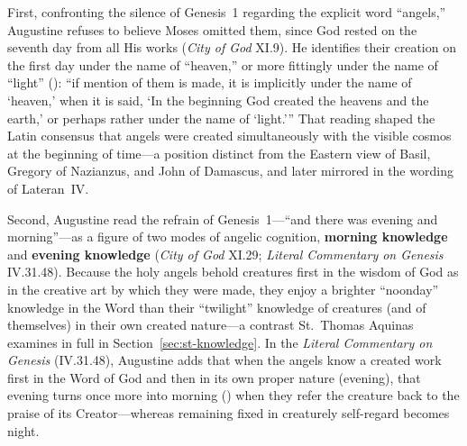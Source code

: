 First, confronting the silence of Genesis~1 regarding the explicit word ``angels,'' Augustine refuses to believe Moses omitted them, since God rested on the seventh day from all His works (\emph{City of God} XI.9). He identifies their creation on the first day under the name of ``heaven,'' or more fittingly under the name of ``light'' (): ``if mention of them is made, it is implicitly under the name of `heaven,' when it is said, `In the beginning God created the heavens and the earth,' or perhaps rather under the name of `light.''' That reading shaped the Latin consensus that angels were created simultaneously with the visible cosmos at the beginning of time---a position distinct from the Eastern view of Basil, Gregory of Nazianzus, and John of Damascus, and later mirrored in the wording of Lateran~IV.

Second, Augustine read the refrain of Genesis~1---``and there was evening and morning''---as a figure of two modes of angelic cognition, \textbf{morning knowledge} and \textbf{evening knowledge} (\emph{City of God} XI.29; \emph{Literal Commentary on Genesis} IV.31.48). Because the holy angels behold creatures first in the wisdom of God as in the creative art by which they were made, they enjoy a brighter ``noonday'' knowledge in the Word than their ``twilight'' knowledge of creatures (and of themselves) in their own created nature---a contrast St.~Thomas Aquinas examines in full in Section~\ref{sec:st-knowledge}. In the \emph{Literal Commentary on Genesis} (IV.31.48), Augustine adds that when the angels know a created work first in the Word of God and then in its own proper nature (evening), that evening turns once more into morning () when they refer the creature back to the praise of its Creator---whereas remaining fixed in creaturely self-regard becomes night.

